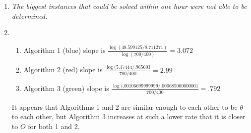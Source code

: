 \documentclass{article}
\begin{document}
\begin{enumerate}
\item \emph{The biggest instances that could be solved within one hour were not able to be determined.}
\item \begin{enumerate}
\item Algorithm 1 (blue) slope is $\frac{\log(48.599125/8.711271)}{\log(700/400)} = 3.072$
\item Algorithm 2 (red) slope is $\frac{\log(5.17444/.965603}{700/400} = 2.99$
\item Algorithm 3 (green) slope is $\frac{\log(.00106699999999/.000685000000001}{700/400} = .792$
\end{enumerate}
It appears that Algorithms 1 and 2 are similar enough to each other to be $\theta$ to each other, but Algorithm 3 increases at such a lower rate that it is closer to $O$ for both 1 and 2.
\end{enumerate}
\end{document}
